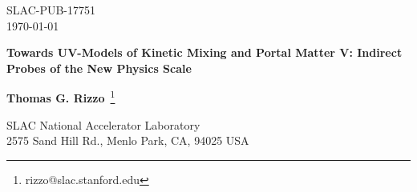 \documentclass[14pt]{article}
\begin{document}

\begin{flushright}
SLAC-PUB-17751\\
\today
\end{flushright}
\vspace*{5mm}

\renewcommand{\thefootnote}{\fnsymbol{footnote}}
\setcounter{footnote}{1}

\begin{center}

{\Large {\bf Towards UV-Models of Kinetic Mixing and Portal Matter V: Indirect Probes of the New Physics Scale
}}\\

\vspace*{0.75cm}


%
{\bf Thomas G. Rizzo}~\footnote{rizzo@slac.stanford.edu}
%

\vspace{0.5cm}


{SLAC National Accelerator Laboratory}\\ 
{2575 Sand Hill Rd., Menlo Park, CA, 94025 USA}

\end{center}
\vspace{.5cm}


\end{document}
